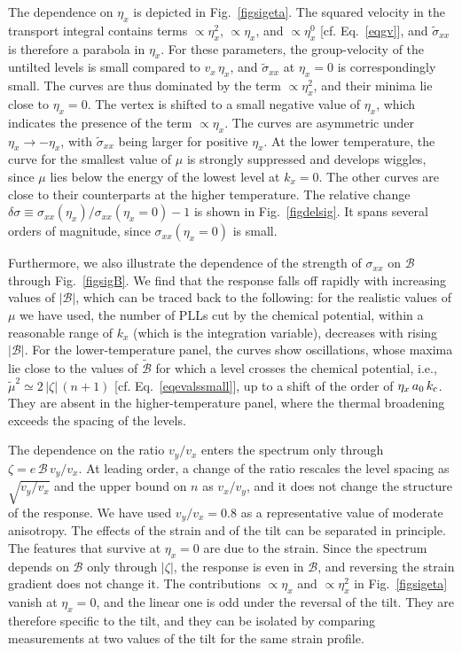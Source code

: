 \documentclass[aps,prb, onecolumn, nofootinbib, citeautoscript,10pt]{revtex4-2}
\begin{document}
The dependence on $\eta_x$ is depicted in Fig.~\ref{figsigeta}. The squared velocity in the transport integral contains terms $\propto\eta_x^2$, $\propto\eta_x$, and $\propto\eta_x^0$ [cf. Eq.~\eqref{eqgv}], and $\tilde\sigma_{xx}$ is therefore a parabola in $\eta_x$. For these parameters, the group-velocity of the untilted levels is small compared to $v_x\,\eta_x$, and $\tilde\sigma_{xx}$ at $\eta_x=0$ is correspondingly small. The curves are thus dominated by the term $\propto\eta_x^2$, and their minima lie close to $\eta_x=0$. The vertex is shifted to a small negative value of $\eta_x$, which indicates the presence of the term $\propto\eta_x$. The curves are asymmetric under $\eta_x\to-\eta_x$, with $\tilde\sigma_{xx}$ being larger for positive $\eta_x$. At the lower temperature, the curve for the smallest value of $\mu$ is strongly suppressed and develops wiggles, since $\mu$ lies below the energy of the lowest level at $k_x=0$. The other curves are close to their counterparts at the higher temperature.  The relative change $\delta\sigma\equiv\sigma_{xx}(\eta_x)/\sigma_{xx}(\eta_x=0)-1$ is shown in Fig.~\ref{figdelsig}. It spans several orders of magnitude, since $\sigma_{xx}(\eta_x=0)$ is small.

Furthermore, we also illustrate the dependence of the strength of $ \sigma_{xx}$ on $\mathcal B $ through Fig.~\ref{figsigB}. We find that the response falls off rapidly with increasing values of $|\mathcal B |$, which can be traced back to the following: for the realistic values of $\mu $ we have used, the number of PLLs cut by the chemical potential, within a reasonable range of $k_x$ (which is the integration variable), decreases with rising $|\mathcal B|$. For the lower-temperature panel, the curves show oscillations, whose maxima lie close to the values of $\tilde{\mathcal B}$ for which a level crosses the chemical potential, i.e., $\tilde\mu^2\simeq2\,|\zeta|\,(n+1)$ [cf. Eq.~\eqref{eqevalssmall}], up to a shift of the order of $\eta_x\,a_0\,k_{\rm c}$. They are absent in the higher-temperature panel, where the thermal broadening exceeds the spacing of the levels.


The dependence on the ratio $v_y/v_x$ enters the spectrum only through $\zeta=e\,\mathcal B\,v_y/v_x$. At leading order, a change of the ratio rescales the level spacing as $\sqrt{v_y/v_x}$ and the upper bound on $n$ as $v_x/v_y$, and it does not change the structure of the response. We have used $v_y/v_x=0.8$ as a representative value of moderate anisotropy. The effects of the strain and of the tilt can be separated in principle. The features that survive at $\eta_x=0$ are due to the strain. Since the spectrum depends on $\mathcal B$ only through $|\zeta|$, the response is even in $\mathcal B$, and reversing the strain gradient does not change it. The contributions $\propto\eta_x$ and $\propto\eta_x^2$ in Fig.~\ref{figsigeta} vanish at $\eta_x=0$, and the linear one is odd under the reversal of the tilt. They are therefore specific to the tilt, and they can be isolated by comparing measurements at two values of the tilt for the same strain profile.
\end{document}
